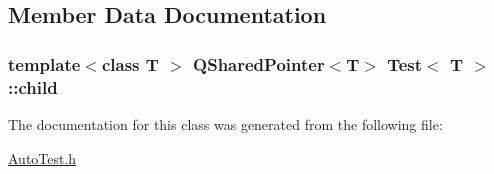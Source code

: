 \subsection{Member Data Documentation}
\hypertarget{classTest_acfb1db9d3c0e3f372aa716b6ead5a00c}{
\subsubsection[{child}]{\setlength{\rightskip}{0pt plus 5cm}template$<$class T $>$ Q\-Shared\-Pointer$<$T$>$ {\bf Test}$<$ T $>$\-::child}}\label{classTest_acfb1db9d3c0e3f372aa716b6ead5a00c}


The documentation for this class was generated from the following file\-:\begin{DoxyCompactItemize}
\item 
\hyperlink{AutoTest_8h}{Auto\-Test.\-h}\end{DoxyCompactItemize}
